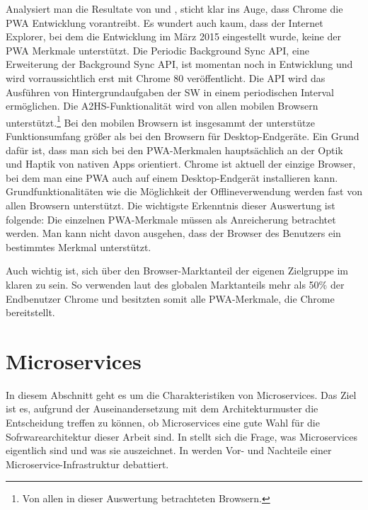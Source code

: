 Analysiert man die Resultate von  und
, sticht klar ins Auge, dass Chrome
die PWA Entwicklung vorantreibt. Es wundert auch kaum, dass der Internet Explorer,
bei dem die Entwicklung im März 2015 eingestellt wurde,\cite{HeiseInternetExplorer} keine der PWA Merkmale
unterstützt. Die Periodic Background Sync API, eine Erweiterung der Background
Sync API, ist momentan noch in Entwicklung und wird vorraussichtlich erst mit
Chrome 80 veröffentlicht. Die API wird das Ausführen von Hintergrundaufgaben der SW
in einem periodischen Interval ermöglichen.\cite{ChromeStatusPeriodicBackgroundSync}
Die A2HS-Funktionalität wird von allen mobilen Browsern unterstützt.\footnote{Von allen in dieser Auswertung betrachteten Browsern.}
Bei den mobilen Browsern ist insgesammt der unterstütze Funktionsumfang größer als
bei den Browsern für Desktop-Endgeräte. Ein Grund dafür ist, dass man sich bei den PWA-Merkmalen
hauptsächlich an der Optik und Haptik von nativen Apps orientiert. Chrome ist aktuell
der einzige Browser, bei dem man eine PWA auch auf einem Desktop-Endgerät installieren
kann. Grundfunktionalitäten wie  die Möglichkeit der Offlineverwendung werden fast von allen
Browsern unterstützt. Die wichtigste Erkenntnis dieser Auswertung ist folgende: Die einzelnen
PWA-Merkmale müssen als Anreicherung betrachtet werden. Man kann nicht davon ausgehen, dass
der Browser des Benutzers ein bestimmtes Merkmal unterstützt.

Auch wichtig ist, sich über den Browser-Marktanteil der eigenen Zielgruppe im klaren zu sein.
So verwenden laut des globalen Marktanteils mehr als 50\% der Endbenutzer Chrome und besitzten somit
alle PWA-Merkmale, die Chrome bereitstellt.\cite{StatCounterBrowserMarketShare}

\section{Microservices}
\label{sec:microservices}
In diesem Abschnitt geht es um die Charakteristiken von Microservices. Das Ziel ist es,
aufgrund der Auseinandersetzung mit dem Architekturmuster die Entscheidung treffen zu können, ob Microservices
eine gute Wahl für die Sofrwarearchitektur dieser Arbeit sind. In 
stellt sich die Frage, was Microservices eigentlich sind und was sie auszeichnet. In
 werden Vor- und Nachteile einer Microservice-Infrastruktur
debattiert.

